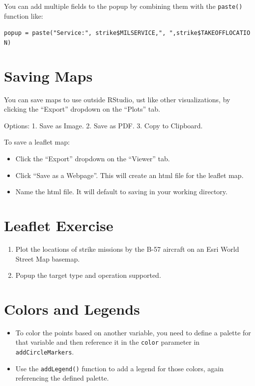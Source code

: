 \documentclass[oneside]{memoir}
\theoremstyle{definition}
\theoremstyle{definition}
\theoremstyle{definition}
\theoremstyle{remark}
\begin{document}
You can add multiple fields to the popup by combining them with the
\texttt{paste()} function like:

\texttt{popup\ =\ paste("Service:",\ strike\$MILSERVICE,",\ ",strike\$TAKEOFFLOCATION)}

\section{Saving Maps}\label{saving-maps}

You can save maps to use outside RStudio, ust like other visualizations,
by clicking the ``Export'' dropdown on the ``Plots'' tab.

Options: 1. Save as Image. 2. Save as PDF. 3. Copy to Clipboard.

To save a leaflet map:

\begin{itemize}
\item
  Click the ``Export'' dropdown on the ``Viewer'' tab.
\item
  Click ``Save as a Webpage''. This will create an html file for the
  leaflet map.
\item
  Name the html file. It will default to saving in your working
  directory.
\end{itemize}

\section{Leaflet Exercise}\label{leaflet-exercise}

\begin{enumerate}
\def\labelenumi{\arabic{enumi}.}
\item
  Plot the locations of strike missions by the B-57 aircraft on an Esri
  World Street Map basemap.
\item
  Popup the target type and operation supported.
\end{enumerate}

\section{Colors and Legends}\label{colors-and-legends}

\begin{itemize}
\item
  To color the points based on another variable, you need to define a
  palette for that variable and then reference it in the \texttt{color}
  parameter in \texttt{addCircleMarkers}.
\item
  Use the \texttt{addLegend()} function to add a legend for those
  colors, again referencing the defined palette.
\end{itemize}
\end{document}
